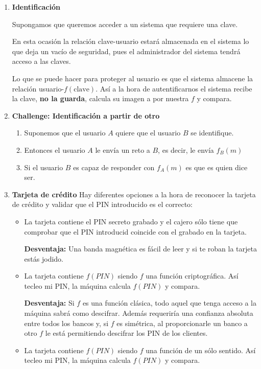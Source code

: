 \begin{enumerate}
\item \textbf{Identificación}

Supongamos que queremos acceder a un sistema que requiere una clave.

En esta ocasión la relación clave-usuario estará almacenada en el sistema lo que deja un vacío de seguridad, pues el administrador del sistema tendrá acceso a las claves.

Lo que se puede hacer para proteger al usuario es que el sistema almacene la relación usuario-$f(\text{clave})$. Así a la hora de autentificarnos el sistema recibe la clave, \textbf{no la guarda}, calcula su imagen a por nuestra $f$ y compara.

\item \textbf{Challenge: Identificación a partir de otro}

\begin{enumerate}
\item Suponemos que el usuario $A$ quiere que el usuario $B$ se identifique.
\item Entonces el usuario $A$ le envía un reto a $B$, es decir, le envía $f_B(m)$
\item Si el usuario $B$ es capaz de responder con $f_A(m)$ es que es quien dice ser.
\end{enumerate}

\item \textbf{Tarjeta de crédito}
Hay diferentes opciones a la hora de reconocer la tarjeta de crédito y validar que el PIN introducido es el correcto:

\begin{itemize}
\item La tarjeta contiene el PIN secreto grabado y el cajero sólo tiene que comprobar que el PIN introducid coincide con el grabado en la tarjeta.

\textbf{Desventaja:} Una banda magnética es fácil de leer y si te roban la tarjeta estás jodido.

\item La tarjeta contiene $f(PIN)$ siendo $f$ una función criptográfica. Así tecleo mi PIN, la máquina calcula $f(PIN)$ y compara.

\textbf{Desventaja:} Si $f$ es una función clásica, todo aquel que tenga acceso a la máquina sabrá como descifrar. Además requeriría una confianza absoluta entre todos los bancos y, si $f$ es simétrica, al proporcionarle un banco a otro $f$ le está permitiendo descifrar los PIN de los clientes.

\item La tarjeta contiene $f(PIN)$ siendo $f$ una función de un sólo sentido. Así tecleo mi PIN, la máquina calcula $f(PIN)$ y compara.


\end{itemize}
\end{enumerate}
